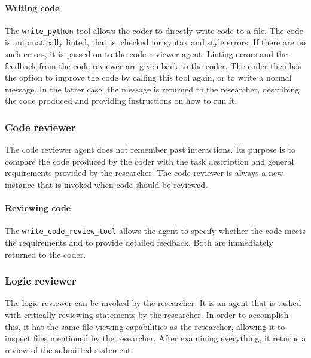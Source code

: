 \documentclass[submission, Phys]{SciPost}
\begin{document}
\paragraph{Writing code} The \verb|write_python| tool allows the coder to directly write code to a file. The code is automatically linted, that is, checked for syntax and style errors. If there are no such errors, it is passed on to the code reviewer agent. Linting errors and the feedback from the code reviewer are given back to the coder. The coder then has the option to improve the code by calling this tool again, or to write a normal message. In the latter case, the message is returned to the researcher, describing the code produced and providing instructions on how to run it. 

\subsubsection{Code reviewer}

The code reviewer agent does not remember past interactions. Its purpose is to compare the code produced by the coder with the task description and general requirements provided by the researcher. The code reviewer is always a new instance that is invoked when code should be reviewed.

\paragraph{Reviewing code} The \verb|write_code_review_tool| allows the agent to specify whether the code meets the requirements and to provide detailed feedback. Both are immediately returned to the coder.

\subsubsection{Logic reviewer}

The logic reviewer can be invoked by the researcher. It is an agent that is tasked with critically reviewing statements by the researcher. In order to accomplish this, it has the same file viewing capabilities as the researcher, allowing it to inspect files mentioned by the researcher. After examining everything, it returns a review of the submitted statement. 





\end{document}
